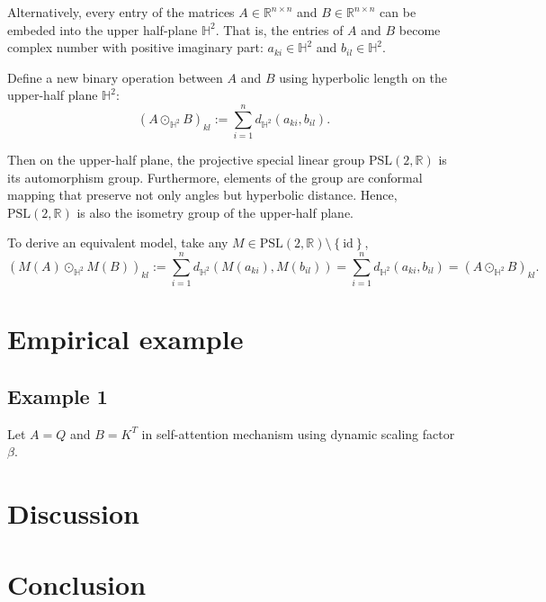 \documentclass{article}
\theoremstyle{plain}
\theoremstyle{plain} %
\theoremstyle{definition}  %
\theoremstyle{remark}  %
\theoremstyle{plain}
\begin{document}
Alternatively, every entry of the matrices $A\in\mathbb{R}^{n\times n}$ and $B \in\mathbb{R}^{n\times n}$ can be embeded into the upper half-plane $\mathbb{H}^2$. That is, the entries of $A$ and $B$ become complex number with positive imaginary part: $a_{ki}\in\mathbb{H}^2$ and $b_{il}\in\mathbb{H}^2$.

Define a new binary operation between $A$ and $B$ using hyperbolic length on the upper-half plane $\mathbb{H}^2$\cite{beardon2012geometry}:
$$
\left( A\odot_{\mathbb{H}^2} B \right)_{kl} :=\sum\limits_{i=1}^n d_{\mathbb{H}^2} \left( a_{ki} , b_{il} \right).
$$

Then on the upper-half plane, the projective special linear group $\text{PSL}(2,\mathbb{R})$ is its automorphism group. Furthermore, elements of the group are conformal mapping that preserve not only angles but hyperbolic distance. Hence, $\text{PSL}(2,\mathbb{R})$ is also the isometry group of the upper-half plane.

To derive an equivalent model, take any $M\in \text{PSL}(2,\mathbb{R})\setminus\left\lbrace \text{id}\right\rbrace$, 
$$
\left( M(A) \odot_{\mathbb{H}^2} M(B)\right)_{kl} := \sum\limits_{i=1}^n d_{\mathbb{H}^2} \left(M \left( a_{ki} \right) ,M\left( b_{il}\right) \right) =  \sum\limits_{i=1}^n d_{\mathbb{H}^2} \left( a_{ki}  , b_{il} \right)  =\left( A\odot_{\mathbb{H}^2} B\right)_{kl}.
$$



\section{Empirical example}
\subsection{Example 1}
Let $A=Q$ and $B=K^T$ in self-attention mechanism\cite{vaswani2017attention} using dynamic scaling factor $\beta$.

\section{Discussion}
\section{Conclusion}




\end{document}

